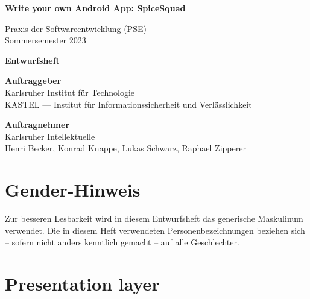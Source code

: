 \documentclass[parskip=full]{scrartcl}
\begin{document}


\begin{titlepage}
    \begin{center}
        \begin{Huge}
            {\textbf{Write your own Android App: SpiceSquad}}
        \end{Huge}
        \vspace{12px}

        Praxis der Softwareentwicklung (PSE)\\
        Sommersemester 2023\\
        \vspace{150px}

        \begin{Huge}
            {\textbf{Entwurfsheft}}
        \end{Huge}
        \vspace{12px}

        \textbf{Auftraggeber}\\
        Karlsruher Institut für Technologie\\
        KASTEL — Institut für Informationssicherheit und Verlässlichkeit\\
        \vspace{330px}

        \textbf{Auftragnehmer}\\
        Karlsruher Intellektuelle\\
        Henri Becker, Konrad Knappe, Lukas Schwarz, Raphael Zipperer\\
    \end{center}
\end{titlepage}

\tableofcontents
\newpage

\section*{Gender-Hinweis}
Zur besseren Lesbarkeit wird in diesem Entwurfsheft das generische Maskulinum verwendet.
Die in diesem Heft verwendeten Personenbezeichnungen beziehen sich – sofern nicht anders kenntlich gemacht – auf alle Geschlechter.


\section{Presentation layer}
    \newpage
\end{document}
